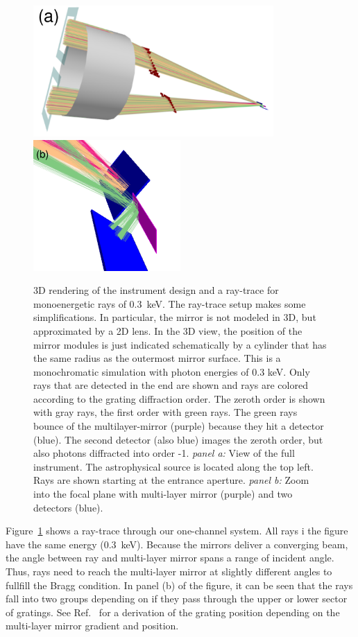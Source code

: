 \documentclass[]{spie}  %
\begin{document}
   \begin{figure} [ht]
   \begin{center}
   \includegraphics[height=5cm]{3D.pdf}
   \includegraphics[height=5cm]{3Ddetector.pdf}
   \end{center}
   \caption
   { \label{fig:3d}3D rendering of the instrument design and a ray-trace for monoenergetic rays of 0.3~keV. The ray-trace setup makes some simplifications. In particular, the mirror is not modeled in 3D, but approximated by a 2D lens. In the 3D view, the position of the mirror modules is just indicated schematically by a cylinder that has the same radius as the outermost mirror surface. This is a monochromatic simulation with photon energies of 0.3 keV. Only rays that are detected in the end are shown and rays are colored according to the grating diffraction order. The zeroth order is shown with gray rays, the first order with green rays. The green rays bounce of the multilayer-mirror (purple) because they hit a detector (blue). The  second detector (also blue) images the zeroth order, but also photons diffracted into order -1. \emph{panel a:} View of the full instrument. The astrophysical source is located along the top left. Rays are shown starting at the entrance aperture. \emph{panel b:} Zoom into the focal plane with multi-layer mirror (purple) and two detectors (blue). 
}
   \end{figure}

Figure~\ref{fig:3d} shows a ray-trace through our one-channel system. All rays i the figure have the same energy (0.3~keV). Because the mirrors deliver a converging beam, the angle between ray and multi-layer mirror spans a range of incident angle. Thus, rays need to reach the multi-layer mirror at slightly different angles to fullfill the Bragg condition. In panel (b) of the figure, it can be seen that the rays fall into two groups depending on if they pass through the upper or lower sector of gratings. See Ref.~ for a derivation of the grating position depending on the multi-layer mirror gradient and position.
\end{document}
